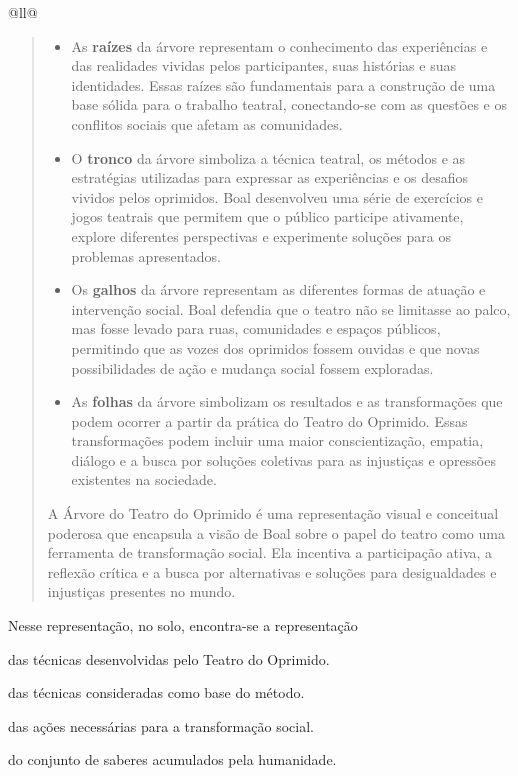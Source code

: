 \begin{itemize}
\begin{itemize}
\begin{escolha}[]{@{}ll@{}}
\begin{quote}
\begin{itemize}
  \item As \textbf{raízes} da árvore representam o conhecimento das experiências e das realidades vividas 
  pelos participantes, suas histórias e suas identidades. Essas raízes são fundamentais para a construção 
  de uma base sólida para o trabalho teatral, conectando-se com as questões e os conflitos sociais que 
  afetam as comunidades.
  \item O \textbf{tronco} da árvore simboliza a técnica teatral, os métodos e as estratégias utilizadas 
  para expressar as experiências e os desafios vividos pelos oprimidos. Boal desenvolveu uma série de 
  exercícios e jogos teatrais que permitem que o público participe ativamente, explore diferentes 
  perspectivas e experimente soluções para os problemas apresentados.
  \item Os \textbf{galhos} da árvore representam as diferentes formas de atuação e intervenção social. Boal 
  defendia que o teatro não se limitasse ao palco, mas fosse levado para ruas, comunidades e espaços 
  públicos, permitindo que as vozes dos oprimidos fossem ouvidas e que novas possibilidades de ação e 
  mudança social fossem exploradas.
  \item As \textbf{folhas} da árvore simbolizam os resultados e as transformações que podem ocorrer a 
  partir da prática do Teatro do Oprimido. Essas transformações podem incluir uma maior conscientização, 
  empatia, diálogo e a busca por soluções coletivas para as injustiças e opressões existentes na sociedade.
\end{itemize}

A Árvore do Teatro do Oprimido é uma representação visual e conceitual poderosa que encapsula a visão de 
Boal sobre o papel do teatro como uma ferramenta de transformação social. Ela incentiva a participação 
ativa, a reflexão crítica e a busca por alternativas e soluções para desigualdades e injustiças presentes 
no mundo.

\end{quote}

Nesse representação, no solo, encontra-se a representação

\begin{escolha}
\item
  das técnicas desenvolvidas pelo Teatro do Oprimido.
\item
  das técnicas consideradas como base do método.
\item
  das ações necessárias para a transformação social.
\item
  do conjunto de saberes acumulados pela humanidade.
\end{escolha}


\end{escolha}
\end{itemize}
\end{itemize}
